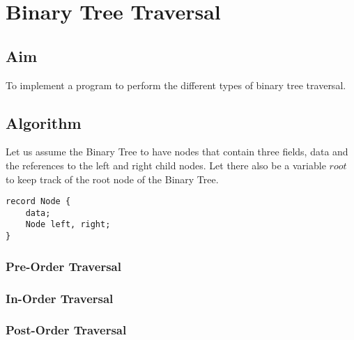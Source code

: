 \chapter{Binary Tree Traversal}

\section{Aim}

{\Large\color{white}
To implement a program to perform the different types of binary tree traversal.
\color{black}}

\section{Algorithm}

{\Large\color{white}
Let us assume the Binary Tree to have nodes that contain three fields, data and the
references to the left and right child nodes. Let there also be a variable $root$
to keep track of the root node of the Binary Tree.
\begin{lstlisting}[style=myC]
record Node {
	data;
	Node left, right;
}
\end{lstlisting}
\color{black}}

\subsection{Pre-Order Traversal}
{\Large\color{white}
\begin{algorithmic}[1]
		\State {}
		\State {}
		\State {}
	\EndFunction
\end{algorithmic}
\color{black}}

\subsection{In-Order Traversal}
{\Large\color{white}
\begin{algorithmic}[1]
		\State {}
		\State {}
		\State {}
	\EndFunction
\end{algorithmic}
\color{black}}

\subsection{Post-Order Traversal}
{\Large\color{white}
\begin{algorithmic}[1]
		\State {}
		\State {}
		\State {}
	\EndFunction
\end{algorithmic}
\color{black}}

